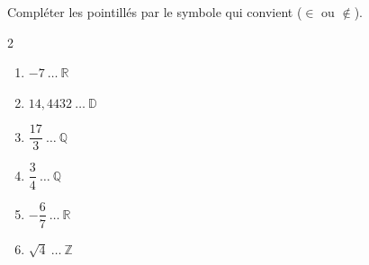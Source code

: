 \begin{exo}{}
	Compléter les pointillés par le symbole qui convient ($\in$ ou $\notin$).
	\begin{multicols}{2}
	\begin{enumerate}[label=\alph*), itemsep=6pt]
		\item $-7 \ \dots \ \mathbb{R}$
		\item $14,4432 \ \dots \ \mathbb{D}$
		\item $\dfrac{17}{3} \ \dots \ \mathbb{Q}$
		\item $\dfrac{3}{4} \ \dots \ \mathbb{Q}$
		\item $-\dfrac{6}{7} \ \dots \ \mathbb{R}$
		\item $\sqrt{4} \ \dots \ \mathbb{Z}$
	\end{enumerate}
	\end{multicols}
\end{exo}
